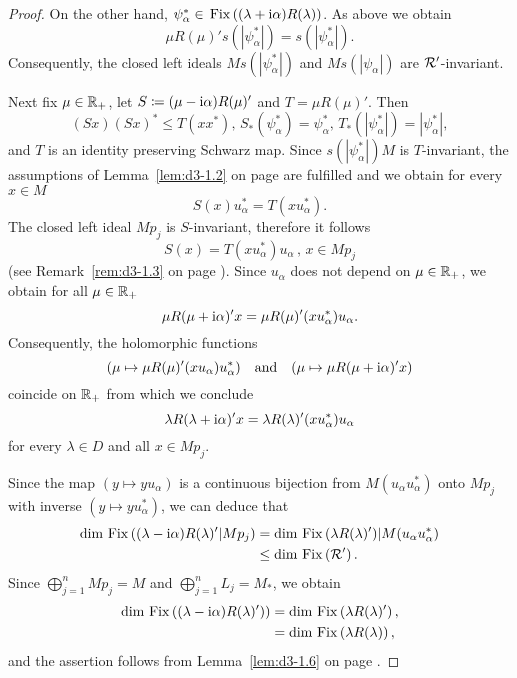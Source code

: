 \begin{proof}
On the other hand, $\psi_{\alpha}^{*} \in \mathop{}\mathrm{Fix}\left((\lambda + \mathrm{i}\alpha)R(\lambda)\right)$.
As above we obtain
\[
\mu R(\mu)'s(|\psi_{\alpha}^{*}|) = s(|\psi_{\alpha}^{*}|) .
\]
Consequently, the closed left ideals $Ms(|\psi_{\alpha}^{*}|)$ and $Ms(|\psi_{\alpha}|)$ are $\mathcal{R}'$-invariant.

Next fix $\mu \in \mathbb{R}_{+}$, let $S \coloneqq (\mu - \mathrm{i}\alpha)R(\mu)'$ and $T = \mu R(\mu)'$.
Then 
%
\[
	(Sx)(Sx)^{*} \leq T(xx^{*}), \,
	S_{*}(\psi_{\alpha}^{*}) = \psi_{\alpha}^{*}, \,
	T_{*}(|\psi_{\alpha}^{*}|) = |\psi_{\alpha}^{*}|, 
\]
%
and $T$ is an identity preserving Schwarz map.
Since $s(|\psi_{\alpha}^{*}|)M$ is $T$-invariant, the assumptions of Lemma~\ref{lem:d3-1.2} on page \pageref{lem:d3-1.2} are fulfilled and we obtain for every $x \in M$
\[
	S(x)u_{\alpha}^{*} = T(xu_{\alpha}^{*}) .
\]
The closed left ideal $Mp_{j}$ is $S$-invariant, therefore it follows
\[
S(x) = T(xu_{\alpha}^{*})u_{\alpha} \, , \, x \in Mp_{j}
\]
(see Remark~\ref{rem:d3-1.3} on page \pageref{rem:d3-1.3}).
Since $u_{\alpha}$ does not depend on $\mu \in \mathbb{R}_{+}$, we obtain for all $\mu \in \mathbb{R}_{+}$
\[
\mu R(\mu+\mathrm{i}\alpha)'x = \mu R(\mu)'(xu_{\alpha}^{*})u_{\alpha}.
\]
Consequently, the holomorphic functions 
%
\[
	(\mu \mapsto \mu R(\mu)'(x u_{\alpha})u_{\alpha}^{*})
	\quad \text{and} \quad
	(\mu \mapsto \mu R(\mu+\mathrm{i}\alpha)'x)
\]
%
coincide on $\mathbb{R}_{+}$ from which we conclude
\[
\lambda R(\lambda+\mathrm{i}\alpha)'x = \lambda R(\lambda)'(xu_{\alpha}^{*})u_{\alpha}
\]
for every $\lambda \in D$ and all $x \in Mp_{j}$.

Since the map $(y \mapsto y u_{\alpha})$ is a continuous bijection from $M(u_{\alpha}u_{\alpha}^{*})$ onto $Mp_{j}$ with inverse $(y \mapsto y u_{\alpha}^{*})$, we can deduce that
\begin{align*}
\dim \mathop{}\mathrm{Fix}\left((\lambda-\mathrm{i}\alpha)R(\lambda)'|Mp_{j}\right) 
	&= \dim \mathop{}\mathrm{Fix}\left(\lambda R(\lambda)')|M(u_{\alpha}u_{\alpha}^{*}\right)  \\
 	&\leq \dim \mathop{}\mathrm{Fix}\left(\mathcal{R}'\right) .
\end{align*}
Since $\bigoplus_{j=1}^{n} Mp_{j} = M$ and $\bigoplus_{j=1}^{n} L_{j} = M_{*}$, we obtain
\begin{align*}
\dim \mathop{}\mathrm{Fix}\left((\lambda - \mathrm{i}\alpha)R(\lambda)')\right) &= \dim \mathop{}\mathrm{Fix}\left(\lambda R(\lambda)'\right) , \\
		&= \dim \mathop{}\mathrm{Fix}\left(\lambda R(\lambda)\right) ,
\end{align*}
and the assertion follows from Lemma~\ref{lem:d3-1.6} on page \pageref{lem:d3-1.6}.
\end{proof}
